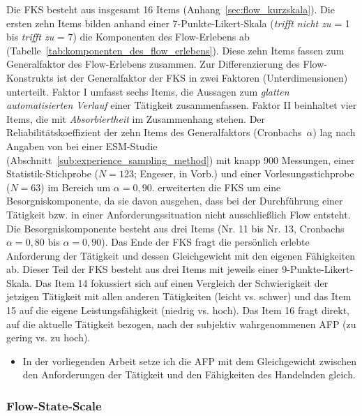 Die \ac{FKS} besteht aus insgesamt 16 Items (Anhang~\ref{sec:flow_kurzskala}). Die ersten zehn Items bilden anhand einer 7-Punkte-Likert-Skala (\emph{trifft nicht zu} = 1 bis \emph{trifft zu} = 7) die Komponenten des Flow-Erlebens ab (Tabelle~\ref{tab:komponenten_des_flow_erlebens}). Diese zehn Items fassen \citet{Rheinberg2003} zum Generalfaktor des Flow-Erlebens zusammen. Zur Differenzierung des Flow-Konstrukts ist der Generalfaktor der \ac{FKS} in zwei Faktoren (Unterdimensionen) unterteilt. Faktor I umfasst sechs Items, die Aussagen zum \emph{glatten automatisierten Verlauf} einer Tätigkeit zusammenfassen. Faktor II beinhaltet vier Items, die mit \emph{Absorbiertheit} im Zusammenhang stehen. Der Reliabilitätskoeffizient der zehn Items des Generalfaktors (Cronbachs~$\alpha$) lag nach Angaben von \citet[S.~9]{Rheinberg2003} bei einer \ac{ESM}-Studie (Abschnitt~\ref{sub:experience_sampling_method}) mit knapp 900 Messungen, einer Statistik-Stichprobe ($N = 123$; Engeser, in Vorb.) und einer Vorlesungsstichprobe ($N = 63$) im Bereich um $\alpha = 0{,}90$. \citet{Rheinberg2003} erweiterten die \ac{FKS} um eine Besorgniskomponente, da sie davon ausgehen, dass bei der Durchführung einer Tätigkeit bzw. in einer Anforderungssituation nicht ausschließlich Flow entsteht. Die Besorgniskomponente besteht aus drei Items (Nr. 11 bis Nr. 13, Cronbachs $\alpha = 0{,}80$ bis $\alpha = 0{,}90$). Das Ende der \ac{FKS} fragt die persönlich erlebte Anforderung der Tätigkeit und dessen Gleichgewicht mit den eigenen Fähigkeiten ab. Dieser Teil der \ac{FKS} besteht aus drei Items mit jeweils einer 9-Punkte-Likert-Skala. Das Item 14 fokussiert sich auf einen Vergleich der Schwierigkeit der jetzigen Tätigkeit mit allen anderen Tätigkeiten (leicht vs. schwer) und das Item 15 auf die eigene Leistungsfähigkeit (niedrig vs. hoch). Das Item 16 fragt direkt, auf die aktuelle Tätigkeit bezogen, nach der subjektiv wahrgenommenen \ac{AFP} (zu gering vs. zu hoch). 
\begin{itemize}
	
	\item In der vorliegenden Arbeit setze ich die \ac{AFP} mit dem Gleichgewicht zwischen den Anforderungen der Tätigkeit und den Fähigkeiten des Handelnden gleich. 
\end{itemize}

\subsubsection{Flow-State-Scale} 

